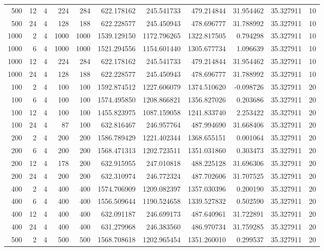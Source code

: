 \begin{table}
\begin{tabular}{rrrrrrrrrrr}
500 & 12 & 4 & 224 & 284 & 622.178162 & 245.541733 & 479.214844 & 31.954462 & 35.327911 & 10 \\
500 & 24 & 4 & 128 & 188 & 622.228577 & 245.450943 & 478.696777 & 31.788992 & 35.327911 & 10 \\
1000 & 2 & 4 & 1000 & 1000 & 1539.129150 & 1172.796265 & 1322.817505 & 0.794298 & 35.327911 & 10 \\
1000 & 6 & 4 & 1000 & 1000 & 1521.294556 & 1154.601440 & 1305.677734 & 1.096639 & 35.327911 & 10 \\
1000 & 12 & 4 & 224 & 284 & 622.178162 & 245.541733 & 479.214844 & 31.954462 & 35.327911 & 10 \\
1000 & 24 & 4 & 128 & 188 & 622.228577 & 245.450943 & 478.696777 & 31.788992 & 35.327911 & 10 \\
100 & 2 & 4 & 100 & 100 & 1592.874512 & 1227.606079 & 1374.510620 & -0.098726 & 35.327911 & 20 \\
100 & 6 & 4 & 100 & 100 & 1574.495850 & 1208.866821 & 1356.827026 & 0.203686 & 35.327911 & 20 \\
100 & 12 & 4 & 100 & 100 & 1455.823975 & 1087.159058 & 1241.833740 & 2.253422 & 35.327911 & 20 \\
100 & 24 & 4 & 87 & 100 & 632.816467 & 246.957764 & 487.994690 & 31.668406 & 35.327911 & 20 \\
200 & 2 & 4 & 200 & 200 & 1586.789429 & 1221.402344 & 1368.655151 & 0.001064 & 35.327911 & 20 \\
200 & 6 & 4 & 200 & 200 & 1568.471313 & 1202.723511 & 1351.031860 & 0.303473 & 35.327911 & 20 \\
200 & 12 & 4 & 178 & 200 & 632.915955 & 247.010818 & 488.225128 & 31.696306 & 35.327911 & 20 \\
200 & 24 & 4 & 200 & 200 & 632.310974 & 246.772324 & 487.702606 & 31.707525 & 35.327911 & 20 \\
400 & 2 & 4 & 400 & 400 & 1574.706909 & 1209.082397 & 1357.030396 & 0.200190 & 35.327911 & 20 \\
400 & 6 & 4 & 400 & 400 & 1556.509644 & 1190.524658 & 1339.527832 & 0.502590 & 35.327911 & 20 \\
400 & 12 & 4 & 400 & 400 & 632.091187 & 246.699173 & 487.640961 & 31.722891 & 35.327911 & 20 \\
400 & 24 & 4 & 400 & 400 & 631.279968 & 246.383560 & 486.970734 & 31.759285 & 35.327911 & 20 \\
500 & 2 & 4 & 500 & 500 & 1568.708618 & 1202.965454 & 1351.260010 & 0.299537 & 35.327911 & 20 \\

\end{tabular}
\end{table}
